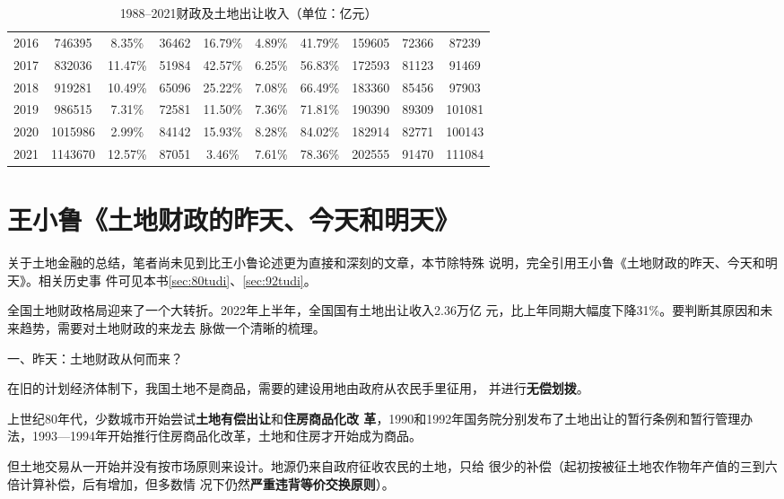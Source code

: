 \begin{table}[h]
{\begin{tabular}{@{}cccccccccc@{}}
2016 & 746395  & 8.35\%  & 36462 & 16.79\%   & 4.89\% & 41.79\% & 159605 & 72366 & 87239  \\
2017 & 832036  & 11.47\% & 51984 & 42.57\%   & 6.25\% & 56.83\% & 172593 & 81123 & 91469  \\
2018 & 919281  & 10.49\% & 65096 & 25.22\%   & 7.08\% & 66.49\% & 183360 & 85456 & 97903  \\
2019 & 986515  & 7.31\%  & 72581 & 11.50\%   & 7.36\% & 71.81\% & 190390 & 89309 & 101081 \\
2020 & 1015986 & 2.99\%  & 84142 & 15.93\%   & 8.28\% & 84.02\% & 182914 & 82771 & 100143 \\
2021 & 1143670 & 12.57\% & 87051 & 3.46\%    & 7.61\% & 78.36\% & 202555 & 91470 & 111084 \\ \bottomrule
\end{tabular}%
}
\caption{1988--2021财政及土地出让收入（单位：亿元）}
\label{tab:19882021}
\end{table}

\section{王小鲁《土地财政的昨天、今天和明天》}

关于土地金融的总结，笔者尚未见到比王小鲁论述更为直接和深刻的文章，本节除特殊
说明，完全引用王小鲁《土地财政的昨天、今天和明天》\cite{wxljintian}。相关历史事
件可见本书\cref{sec:80tudi}、\cref{sec:92tudi}。

全国土地财政格局迎来了一个大转折。2022年上半年，全国国有土地出让收入2.36万亿
元，比上年同期大幅度下降31\%。要判断其原因和未来趋势，需要对土地财政的来龙去
脉做一个清晰的梳理。

{\heiti 一、昨天：土地财政从何而来？}

在旧的计划经济体制下，我国土地不是商品，需要的建设用地由政府从农民手里征用，
并进行\textbf{无偿划拨}。

上世纪80年代，少数城市开始尝试\textbf{土地有偿出让}和\textbf{住房商品化改
  革}，1990和1992年国务院分别发布了土地出让的暂行条例和暂行管理办
法，1993—1994年开始推行住房商品化改革，土地和住房才开始成为商品。

但土地交易从一开始并没有按市场原则来设计。地源仍来自政府征收农民的土地，只给
很少的补偿（起初按被征土地农作物年产值的三到六倍计算补偿，后有增加，但多数情
况下仍然\textbf{严重违背等价交换原则}）。

